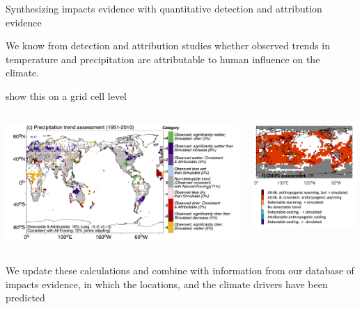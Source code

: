 \documentclass[9pt]{beamer}
\begin{document}
\begin{frame}{Synthesizing impacts evidence with quantitative detection and attribution evidence}

We know from detection and attribution studies whether observed trends in temperature and precipitation are attributable to human influence on the climate.

\cite{Knutson2013, Knutson2018} show this on a grid cell level

\begin{columns}
	\begin{column}{0.65\linewidth}
		\includegraphics[width=\linewidth]{images/knutson_precip_da}
	\end{column}
	\begin{column}{0.35\linewidth}
		\includegraphics[width=\linewidth]{images/knutson_temp_da}
	\end{column}
\end{columns}

We update these calculations and combine with information from our database of impacts evidence, in which the locations, and the climate drivers have been predicted

\end{frame}
\end{document}
